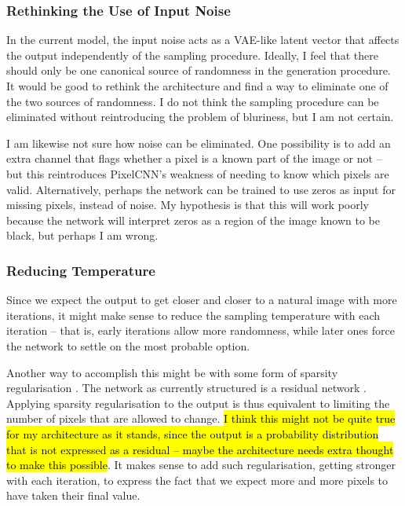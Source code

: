 \documentclass[10pt,a4paper]{article}
\begin{document}
\subsubsection{Rethinking the Use of Input Noise}

In the current model, the input noise acts as a VAE-like latent vector that affects the output independently of the sampling procedure. Ideally, I feel that there should only be one canonical source of randomness in the generation procedure. It would be good to rethink the architecture and find a way to eliminate one of the two sources of randomness. I do not think the sampling procedure can be eliminated without reintroducing the problem of bluriness, but I am not certain.

I am likewise not sure how noise can be eliminated. One possibility is to add an extra channel that flags whether a pixel is a known part of the image or not -- but this reintroduces PixelCNN's weakness of needing to know which pixels are valid. Alternatively, perhaps the network can be trained to use zeros as input for missing pixels, instead of noise. My hypothesis is that this will work poorly because the network will interpret zeros as a region of the image known to be black, but perhaps I am wrong.

\subsubsection{Reducing Temperature}

Since we expect the output to get closer and closer to a natural image with more iterations, it might make sense to reduce the sampling temperature with each iteration -- that is, early iterations allow more randomness, while later ones force the network to settle on the most probable option.

Another way to accomplish this might be with some form of sparsity regularisation \cite{??}. The network as currently structured is a residual network \cite{resnet}. Applying sparsity regularisation to the output is thus equivalent to limiting the number of pixels that are allowed to change. \hl{I think this might not be quite true for my architecture as it stands, since the output is a probability distribution that is not expressed as a residual -- maybe the architecture needs extra thought to make this possible}. It makes sense to add such regularisation, getting stronger with each iteration, to express the fact that we expect more and more pixels to have taken their final value.
\end{document}
